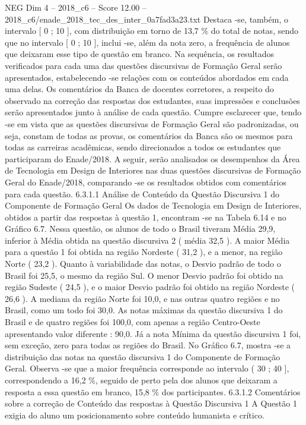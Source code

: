 \begin{textsample}{NEG Dim 4 – 2018\_c6 – Score 12.00 – 2018\_c6/enade\_2018\_tec\_des\_inter\_0a7fad3a23.txt}
Destaca -se, também, o intervalo [ 0 ; 10 ], com distribuição em torno de 13,7 \% do total de notas, sendo que no intervalo [ 0 ; 10 ], inclui -se, além da nota zero, a frequência de alunos que deixaram esse tipo de questão em branco.
Na sequência, os resultados verificados para cada uma das questões discursivas de Formação Geral serão apresentados, estabelecendo -se relações com os conteúdos abordados em cada uma delas.
Os comentários da Banca de docentes corretores, a respeito do observado na correção das respostas dos estudantes, suas impressões e conclusões serão apresentados junto à análise de cada questão.
Cumpre esclarecer que, tendo -se em vista que as questões discursivas de Formação Geral são padronizadas, ou seja, constam de todas as provas, os comentários da Banca são os mesmos para todas as carreiras acadêmicas, sendo direcionados a todos os estudantes que participaram do Enade/2018.
A seguir, serão analisados os desempenhos da Área de Tecnologia em Design de Interiores nas duas questões discursivas de Formação Geral do Enade/2018, comparando -se os resultados obtidos com comentários para cada questão. 6.3.1.1 Análise de Conteúdo da Questão Discursiva 1 do Componente de Formação Geral Os dados de Tecnologia em Design de Interiores, obtidos a partir das respostas à questão 1, encontram -se na Tabela 6.14 e no Gráfico 6.7.
Nessa questão, os alunos de todo o Brasil tiveram Média 29,9, inferior à Média obtida na questão discursiva 2 ( média 32,5 ).
A maior Média para a questão 1 foi obtida na região Nordeste ( 31,2 ), e a menor, na região Norte ( 23,2 ).
Quanto à variabilidade das notas, o Desvio padrão de todo o Brasil foi 25,5, o mesmo da região Sul.
O menor Desvio padrão foi obtido na região Sudeste ( 24,5 ), e o maior Desvio padrão foi obtido na região Nordeste ( 26,6 ).
A mediana da região Norte foi 10,0, e nas outras quatro regiões e no Brasil, como um todo foi 30,0.
As notas máximas da questão discursiva 1 do Brasil e de quatro regiões foi 100,0, com apenas a região Centro-Oeste apresentando valor diferente : 90,0.
Já a nota Mínima da questão discursiva 1 foi, sem exceção, zero para todas as regiões do Brasil.
No Gráfico 6.7, mostra -se a distribuição das notas na questão discursiva 1 do Componente de Formação Geral.
Observa -se que a maior frequência corresponde ao intervalo ( 30 ; 40 ], correspondendo a 16,2 \%, seguido de perto pela dos alunos que deixaram a resposta a essa questão em branco, 15,8 \% dos participantes. 6.3.1.2 Comentários sobre a correção de Conteúdo das respostas à Questão Discursiva 1 A Questão 1 exigia do aluno um posicionamento sobre conteúdo humanista e crítico.

\end{textsample}
